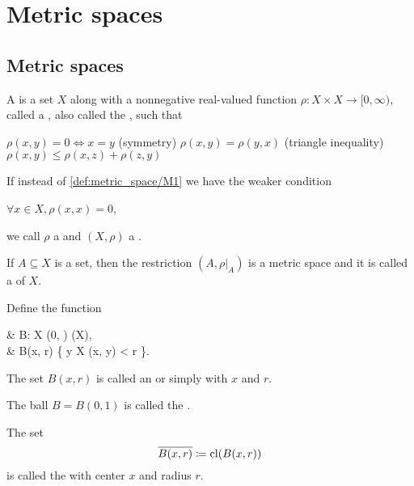 \section{Metric spaces}\label{sec:metric_spaces}
\subsection{Metric spaces}\label{subsec:metric_spaces}

\begin{definition}\label{def:metric_space}
  A  is a set \( X \) along with a nonnegative real-valued function \( \rho: X \times X \to [0, \infty) \), called a , also called the , such that
  \begin{thmenum}[series=def:metric_space]
     \( \rho(x, y) = 0 \iff x = y \)
    (symmetry) \( \rho(x, y) = \rho(y, x) \)
    (triangle inequality) \( \rho(x, y) \leq \rho(x, z) + \rho(z, y) \)
  \end{thmenum}

  If instead of \ref{def:metric_space/M1} we have the weaker condition
  \begin{thmenum}[resume=def:metric_space]
     \( \forall x \in X, \rho(x, x) = 0 \),
  \end{thmenum}
  we call \( \rho \) a  and \( (X, \rho) \) a .

  \begin{thmenum}
     If \( A \subseteq X \) is a set, then the restriction \( (A, \rho{\rvert_A}) \) is a metric space and it is called a  of \( X \).

     Define the function
    \begin{balign*}
       & B: X \times (0, \infty) \to \pow(X),                   \\
       & B(x, r) \coloneqq \{ y \in X \colon \rho(x, y) < r \}.
    \end{balign*}

    The set \( B(x, r) \) is called an  or simply  with  \( x \) and  \( r \).

    The ball \( B = B(0, 1) \) is called the .

     The set
    \begin{equation*}
      \overline{B(x, r)} \coloneqq \operatorname{cl}(B(x, r))
    \end{equation*}
    is called the  with center \( x \) and radius \( r \).


\end{thmenum}
\end{definition}
